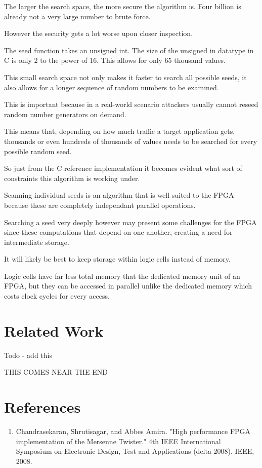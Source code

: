 \documentclass{article}
\begin{document}
    The larger the search space, the more secure the algorithm is.
    Four billion is already not a very large number to brute force.

    However the security gets a lot worse upon closer inspection.

    The seed function takes an unsigned int. The size of the unsigned in datatype
    in C is only 2 to the power of 16. This allows for only 65 thousand values.

    This small search space not only makes it faster to search all possible seeds,
    it also allows for a longer sequence of random numbers to be examined.

    This is important because in a real-world scenario attackers usually cannot
    reseed random number generators on demand.

    This means that, depending on how much traffic a target application gets,
    thousands or even hundreds of thousands of values needs to be searched for
    every possible random seed.

    So just from the C reference implementation it becomes evident what sort
    of constraints this algorithm is working under.

    Scanning individual seeds is an algorithm that is well suited to the FPGA
    because these are completely independant parallel operations.

    Searching a seed very deeply however may present some challenges for the
    FPGA since these computations that depend on one another, creating a
    need for intermediate storage.

    It will likely be best to keep storage within logic cells instead of memory.

    Logic cells have far less total memory that the dedicated memory unit of an FPGA,
    but they can be accessed in parallel unlike the dedicated memory which costs
    clock cycles for every access.
    
    \section{Related Work}

    Todo - add this

    THIS COMES NEAR THE END

    \break
    \section*{References}

    \begin{enumerate}

    \item Chandrasekaran, Shrutisagar, and Abbes Amira. "High performance FPGA implementation of the Mersenne Twister." 4th IEEE International Symposium on Electronic Design, Test and Applications (delta 2008). IEEE, 2008.

    \end{enumerate}
    
\end{document}
